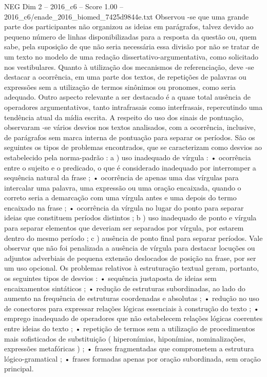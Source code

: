 \begin{textsample}{NEG Dim 2 – 2016\_c6 – Score 1.00 – 2016\_c6/enade\_2016\_biomed\_7425d9844e.txt}
Observou -se que uma grande parte dos participantes não organizou as ideias em parágrafos, talvez devido ao pequeno número de linhas disponibilizadas para a resposta da questão ou, quem sabe, pela suposição de que não seria necessária essa divisão por não se tratar de um texto no modelo de uma redação dissertativo-argumentativa, como solicitado nos vestibulares.
Quanto à utilização dos mecanismos de referenciação, deve -se destacar a ocorrência, em uma parte dos textos, de repetições de palavras ou expressões sem a utilização de termos sinônimos ou pronomes, como seria adequado.
Outro aspecto relevante a ser destacado é a quase total ausência de operadores argumentativos, tanto intrafrasais como interfrasais, repercutindo uma tendência atual da mídia escrita.
A respeito do uso dos sinais de pontuação, observaram -se vários desvios nos textos analisados, com a ocorrência, inclusive, de parágrafos sem marca interna de pontuação para separar os períodos.
São os seguintes os tipos de problemas encontrados, que se caracterizam como desvios ao estabelecido pela norma-padrão : a ) uso inadequado de vírgula : • ocorrência entre o sujeito e o predicado, o que é considerado inadequado por interromper a sequência natural da frase ; • ocorrência de apenas uma das vírgulas para intercalar uma palavra, uma expressão ou uma oração encaixada, quando o correto seria a demarcação com uma vírgula antes e uma depois do termo encaixado na frase ; • ocorrência da vírgula no lugar do ponto para separar ideias que constituem períodos distintos ; b ) uso inadequado de ponto e vírgula para separar elementos que deveriam ser separados por vírgula, por estarem dentro do mesmo período ; c ) ausência de ponto final para separar períodos.
Vale observar que não foi penalizada a ausência de vírgula para destacar locuções ou adjuntos adverbiais de pequena extensão deslocados de posição na frase, por ser um uso opcional.
Os problemas relativos à estruturação textual geram, portanto, os seguintes tipos de desvios : • sequência justaposta de ideias sem encaixamentos sintáticos ; • redução de estruturas subordinadas, ao lado do aumento na frequência de estruturas coordenadas e absolutas ; • redução no uso de conectores para expressar relações lógicas essenciais à construção do texto ; • emprego inadequado de operadores que não estabelecem relações lógicas coerentes entre ideias do texto ; • repetição de termos sem a utilização de procedimentos mais sofisticados de substituição ( hiperonímias, hiponímias, nominalizações, expressões metafóricas ) ; • frases fragmentadas que comprometem a estrutura lógico-gramatical ; • frases formadas apenas por oração subordinada, sem oração principal.

\end{textsample}
